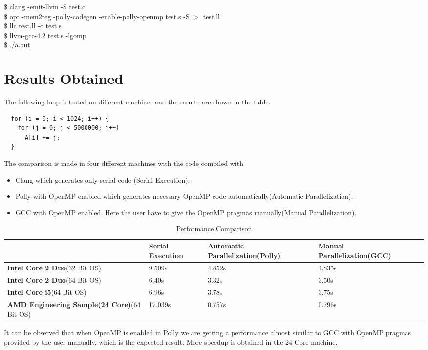 \documentclass[a4paper,10pt]{article}
\begin{document}
{\footnotesize
  \$ clang -emit-llvm -S test.c\\
  \$ opt -mem2reg -polly-codegen -enable-polly-openmp test.s -S {\tiny $>$} test.ll\\
  \$ llc test.ll -o test.s\\
  \$ llvm-gcc-4.2 test.s -lgomp\\
  \$ ./a.out
}
\section{Results Obtained}
The following loop is tested on different machines and the results are shown in the table.
{\footnotesize
\begin{lstlisting}
  for (i = 0; i < 1024; i++) {
    for (j = 0; j < 5000000; j++)
      A[i] += j;
  }
\end{lstlisting}
}
The comparison is made in four different machines with the code compiled with
{\footnotesize
\begin{itemize}
\item Clang\cite{clang} which generates only serial code (Serial Execution).
\item Polly with OpenMP enabled which generates necessary OpenMP code automatically(Automatic Parallelization).
\item GCC with OpenMP enabled. Here the user have to give the OpenMP pragmas manually(Manual Parallelization).
\end{itemize}
}
\begin{table}[h]
\begin{center}
{\footnotesize
\begin{tabular}{| l | p{2cm} | p{2cm} | p{2cm} | p{2cm} |}
\hline
& \textbf{Serial Execution} & \textbf{Automatic Parallelization(Polly)} & \textbf{Manual Parallelization(GCC)} \\ \hline
\textbf{Intel Core 2 Duo}(32 Bit OS)& 9.509s & 4.852s & 4.835s \\ \hline
\textbf{Intel Core 2 Duo}(64 Bit OS)& 6.40s  & 3.32s & 3.50s\\ \hline
\textbf{Intel Core i5}(64 Bit OS)   & 6.96s  & 3.78s & 3.75s\\ \hline
\textbf{AMD Engineering Sample(24 Core)}(64 Bit OS)   & 17.039s & 0.757s & 0.796s\\
\hline
\end{tabular}
}
\end{center}
\caption{Performance Comparison}
\end{table}
It can be observed that when OpenMP is enabled in Polly we are getting a performance
almost similar to GCC  with OpenMP pragmas provided by the user manually, which is the expected result. More
speedup is obtained in the 24 Core machine.
\end{document}
